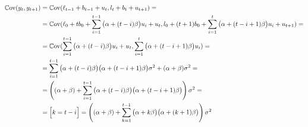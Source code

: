 \begin{problem}
\begin{sol}
  \begin{align*}
      \operatorname{\mathbb{C}\mathrm{ov}}(y_t, y_{t+1}) &= \operatorname{\mathbb{C}\mathrm{ov}}(\ell_{t-1} + b_{t-1} + u_t, l_{t} + b_{t} + u_{t+1}) = \\
      &= \operatorname{\mathbb{C}\mathrm{ov}}(\ell_0 + t b_0 + \sum_{i = 1}^{t-1} \big(\alpha + (t - i)\beta\big) u_i + u_t, l_0 + (t+1) b_0 + \sum_{i = 1}^{t} \big(\alpha + (t - i + 1)\beta\big) u_i + u_{t+1}) = \\
      &= \operatorname{\mathbb{C}\mathrm{ov}}(\sum_{i = 1}^{t-1} \big(\alpha + (t - i)\beta\big) u_i + u_t, \sum_{i = 1}^{t} \big(\alpha + (t - i + 1)\beta\big) u_i) = \\
      &= \sum_{i = 1}^{t-1} \big(\alpha + (t - i)\beta\big)\big(\alpha + (t - i + 1)\beta\big) \sigma^2 + (\alpha + \beta) \sigma^2 = \\
      &= \left( (\alpha + \beta) + \sum_{i = 1}^{t-1} \big(\alpha + (t - i)\beta\big)\big(\alpha + (t - i + 1)\beta\big) \right)\sigma^2 = \\
      &= \Big[k = t - i\Big]= \left( (\alpha + \beta) + \sum_{k = 1}^{t-1} \big(\alpha + k\beta\big)\big(\alpha + (k + 1)\beta\big) \right)\sigma^2
  \end{align*}
\end{sol}
\end{problem}


